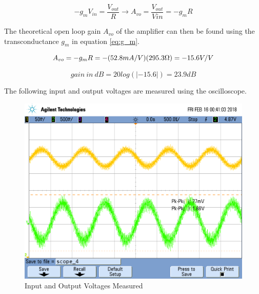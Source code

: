 \begin{equation}
	\label{eq:ss_kcl}
	-g_mV_{in} = \frac{V_{out}}{R} \rightarrow A_{vo} = \frac{V_{out}}{V{in}} = -g_mR
\end{equation}

\FloatBarrier

The theoretical open loop gain $A_{vo}$ of the amplifier can then be found using the transconductance $g_m$ in equation \ref{eq:g_m}.

\FloatBarrier

\begin{equation}
	\label{eq:theoretical_gain}
	A_{vo} = -g_mR = -(52.8 mA/V)(295.3 \Omega) = -15.6 V/V \\
\end{equation}

\begin{equation}
	\label{eq:theoretical_gain_db}
        gain \ in \ dB = 20 log(|-15.6|) = 23.9 dB
\end{equation}

\FloatBarrier

The following input and output voltages are measured using the oscilloscope.

\FloatBarrier

\begin{figure}[h!]
	\centering
		\includegraphics[scale=0.35]{./images/scope_4.png}
		\caption{Input and Output Voltages Measured}
		\label{fig:measured_vin_vout}
\end{figure}

\FloatBarrier

